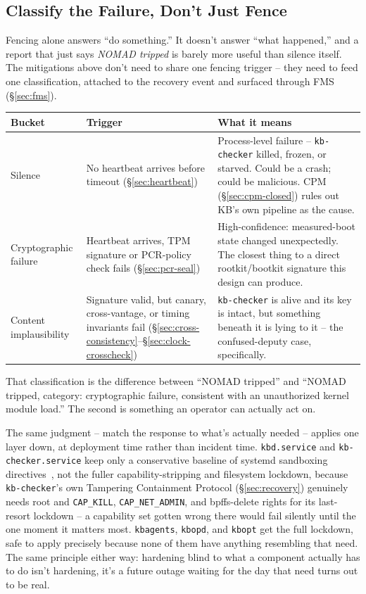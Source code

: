 \documentclass[11pt,a4paper]{article}
\begin{document}
\subsection{Classify the Failure, Don't Just Fence}
\label{sec:classify}

Fencing alone answers ``do something.'' It doesn't answer ``what
happened,'' and a report that just says \emph{NOMAD tripped} is barely
more useful than silence itself. The mitigations above don't need to
share one fencing trigger -- they need to feed one classification,
attached to the recovery event and surfaced through FMS
(\S\ref{sec:fms}).

\begin{center}
\renewcommand{\arraystretch}{1.45}
\small
\begin{tabular}{@{}p{2.9cm}p{4.6cm}p{5.5cm}@{}}
\toprule
\textbf{Bucket} & \textbf{Trigger} & \textbf{What it means} \\
\midrule
Silence & No heartbeat arrives before timeout (\S\ref{sec:heartbeat}) &
Process-level failure -- \texttt{kb-checker} killed, frozen, or
starved. Could be a crash; could be malicious. CPM
(\S\ref{sec:cpm-closed}) rules out KB's own pipeline as the cause. \\
Cryptographic failure & Heartbeat arrives, TPM signature or PCR-policy
check fails (\S\ref{sec:pcr-seal}) & High-confidence: measured-boot
state changed unexpectedly. The closest thing to a direct
rootkit/bootkit signature this design can produce. \\
Content implausibility & Signature valid, but canary, cross-vantage, or
timing invariants fail (\S\ref{sec:cross-consistency}--\S\ref{sec:clock-crosscheck}) &
\texttt{kb-checker} is alive and its key is intact, but something
beneath it is lying to it -- the confused-deputy case, specifically. \\
\bottomrule
\end{tabular}
\end{center}

That classification is the difference between ``NOMAD tripped'' and
``NOMAD tripped, category: cryptographic failure, consistent with an
unauthorized kernel module load.'' The second is something an operator
can actually act on.

The same judgment -- match the response to what's actually needed --
applies one layer down, at deployment time rather than incident time.
\texttt{kbd.service} and \texttt{kb-checker.service} keep only a
conservative baseline of systemd sandboxing directives~\cite{systemdexec}, not the fuller
capability-stripping and filesystem lockdown, because
\texttt{kb-checker}'s own Tampering Containment Protocol
(\S\ref{sec:recovery}) genuinely needs root and \texttt{CAP\_KILL},
\texttt{CAP\_NET\_ADMIN}, and bpffs-delete rights for its last-resort
lockdown -- a capability set gotten wrong there would fail silently
until the one moment it matters most. \texttt{kbagents},
\texttt{kbopd}, and \texttt{kbopt} get the full lockdown, safe to apply
precisely because none of them have anything resembling that need. The
same principle either way: hardening blind to what a component
actually has to do isn't hardening, it's a future outage waiting for
the day that need turns out to be real.
\end{document}
